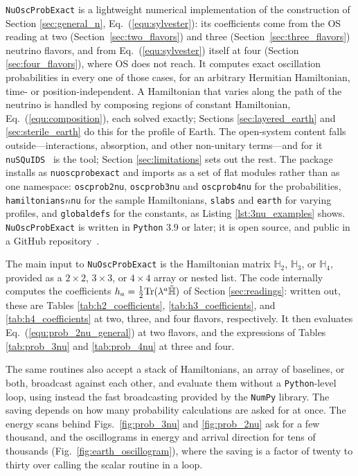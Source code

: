 \documentclass[final,5p,times,twocolumn,sort,compress]{elsarticle}
\newcommand{\eq}{Eq.}
\newcommand{\fig}{Fig.}
\newcommand{\equ}[1]{\eq~(\ref{equ:#1})}
\newcommand{\figu}[1]{\fig~\ref{fig:#1}}
\begin{document}
{\tt NuOscProbExact} is a lightweight numerical implementation of the construction of Section \ref{sec:general_n}, \equ{sylvester}: its coefficients come from the OS reading at two (Section~\ref{sec:two_flavors}) and three (Section~\ref{sec:three_flavors}) neutrino flavors, and from \equ{sylvester} itself at four (Section \ref{sec:four_flavors}), where OS does not reach.  It computes exact oscillation probabilities in every one of those cases, for an arbitrary Hermitian Hamiltonian, time- or position-independent.  A Hamiltonian that varies along the path of the neutrino is handled by composing regions of constant Hamiltonian, \equ{composition}, each solved exactly; Sections \ref{sec:layered_earth} and \ref{sec:sterile_earth} do this for the profile of Earth.  The open-system content falls outside---interactions, absorption, and other non-unitary terms---and for it {\tt nuSQuIDS}\ \cite{NuSQuIDS} is the tool; Section \ref{sec:limitations} sets out the rest.  The package installs as {\tt nuoscprobexact} and imports as a set of flat modules rather than as one namespace: {\tt oscprob2nu}, {\tt oscprob3nu} and {\tt oscprob4nu} for the probabilities, {\tt hamiltonians$n$nu} for the sample Hamiltonians, {\tt slabs} and {\tt earth} for varying profiles, and {\tt globaldefs} for the constants, as Listing \ref{lst:3nu_examples} shows.  {\tt NuOscProbExact} is written in {\tt Python} 3.9 or later; it is open source, and public in a GitHub repository\ \cite{NuOscProbExact}.

The main input to {\tt NuOscProbExact} is the Hamiltonian matrix $\mathbb{H}_2$, $\mathbb{H}_3$, or $\mathbb{H}_4$, provided as a $2 \times 2$, $3 \times 3$, or $4 \times 4$ array or nested list.  The code internally computes the coefficients $h_a = \frac{1}{2}{\rm Tr}(\lambda^a \tilde{\mathbb{H}})$ of Section \ref{sec:readings}: written out, these are Tables \ref{tab:h2_coefficients}, \ref{tab:h3_coefficients}, and \ref{tab:h4_coefficients} at two, three, and four flavors, respectively.  It then evaluates \equ{prob_2nu_general} at two flavors, and the expressions of Tables \ref{tab:prob_3nu} and \ref{tab:prob_4nu} at three and four.

The same routines also accept a stack of Hamiltonians, an array of baselines, or both, broadcast against each other, and evaluate them without a {\tt Python}-level loop, using instead the fast broadcasting provided by the {\tt NumPy} library.  The saving depends on how many probability calculations are asked for at once.  The energy scans behind Figs.~\ref{fig:prob_3nu} and \ref{fig:prob_2nu} ask for a few thousand, and the oscillograms in energy and arrival direction for tens of thousands (\figu{earth_oscillogram}), where the saving is a factor of twenty to thirty over calling the scalar routine in a loop.
\end{document}
